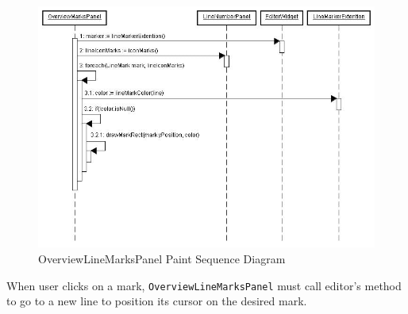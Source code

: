 \documentclass[11pt,a4paper]{report}
\begin{document}
\begin{figure}[hbt]
\centering
\includegraphics{images/overviewmarkspanelpaint.jpg}
\caption{OverviewLineMarksPanel Paint Sequence Diagram} \label{overviewmarkspanelpaint}
\end{figure}

When user clicks on a mark, \texttt{OverviewLineMarksPanel} must call editor's method to go to a new line to position its cursor on the desired mark.



\end{document}
